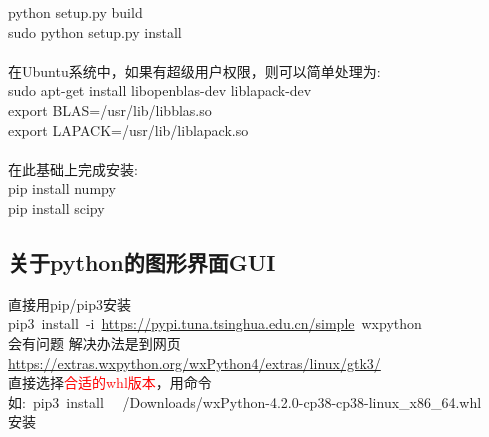 \documentclass[10pt,a4paper]{article}
\begin{document}
python setup.py build\\
sudo python setup.py install\\
\\
在\textrm{Ubuntu}系统中，如果有超级用户权限，则可以简单处理为:\\
sudo apt-get install libopenblas-dev liblapack-dev\\
export BLAS=/usr/lib/libblas.so\\
export LAPACK=/usr/lib/liblapack.so\\
\\
在此基础上完成安装:\\
pip install numpy\\
pip install scipy\\

\subsection{关于\rm{python}的图形界面\rm{GUI}}
直接用\textrm{pip/pip3}安装\\
\textrm{pip3~install~-i~\url{https://pypi.tuna.tsinghua.edu.cn/simple}~wxpython}\\
会有问题
解决办法是到网页\\
\url{https://extras.wxpython.org/wxPython4/extras/linux/gtk3/}\\
直接选择\textcolor{red}{合适的\textrm{whl}版本}，用命令\\
如:~\textrm{pip3~install~ ~/Downloads/wxPython-4.2.0-cp38-cp38-linux\_x86\_64.whl}\\
安装
\end{document}
